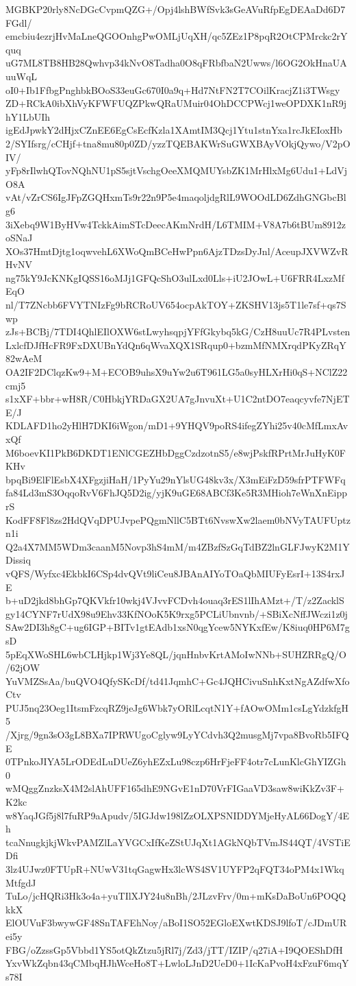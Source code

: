 MGBKP20rly8NcDGcCvpmQZG+/Opj4lshBWfSvk3sGeAVuRfpEgDEAaDd6D7FGdl/
emcbiu4ezrjHvMaLneQGOOnhgPwOMLjUqXH/qc5ZEz1P8pqR2OtCPMrckc2rYquq
uG7ML8TB8HB28Qwhvp34kNvO8Tadha0O8qFRbfbaN2Uwws/l6OG2OkHnaUAuuWqL
oI0+Ib1FfbgPnghbkBOoS33euGc670I0a9q+Hd7NtFN2T7COilKracjZ1i3TWsgy
ZD+RCkA0ibXhVyKFWFUQZPkwQRaUMuir04OhDCCPWcj1weOPDXK1nR9jhY1LbUIh
igEdJpwkY2dHjxCZnEE6EgCsEcfKzla1XAmtIM3Qcj1Ytu1stnYxa1rcJkEIoxHb
2/SYIfsrg/cCHjf+tna8mu80p0ZD/yzzTQEBAKWrSuGWXBAyVOkjQywo/V2pOIV/
yFp8rIlwhQTovNQhNU1pS5sjtVschgOeeXMQMUYsbZK1MrHlxMg6Udu1+LdVjO8A
vAt/vZrCS6IgJFpZGQHxmTs9r22n9P5e4maqoljdgRlL9WOOdLD6ZdhGNGbcBlg6
3iXebq9W1ByHVw4TckkAimSTcDeecAKmNrdH/L6TMIM+V8A7b6tBUm8912zoSNaJ
XOs37HmtDjtg1oqwvehL6XWoQmBCeHwPpn6AjzTDzsDyJnl/AceupJXVWZvRHvNV
ng75kY9JcKNKgIQSS16oMJj1GFQcShO3ulLxd0Lls+iU2JOwL+U6FRR4LxzMfEqO
nl/T7ZNcbb6FVYTNIzFg9bRCRoUV654ocpAkTOY+ZKSHV13js5T1le7sf+qs7Swp
zJs+BCBj/7TDI4QhlEIlOXW6stLwyhsqpjYFfGkybq5kG/CzH8uuUc7R4PLvsten
LxlcfDJfHcFR9FxDXUBnYdQn6qWvaXQX1SRqup0+bzmMfNMXrqdPKyZRqY82wAeM
OA2IF2DClqzKw9+M+ECOB9uhsX9uYw2u6T961LG5a0syHLXrHi0qS+NClZ22cmj5
s1xXF+bbr+wH8R/C0HbkjYRDaGX2UA7gJnvuXt+U1C2ntDO7eaqcyvfe7NjETE/J
KDLAFD1ho2yHlH7DKI6iWgon/mD1+9YHQV9poRS4ifegZYhi25v40cMfLmxAvxQf
M6boevKI1PkB6DKDT1ENlCGEZHbDggCzdzotnS5/e8wjPskfRPrtMrJuHyK0FKHv
bpqBi9ElFlEsbX4XFgzjiHaH/1PyYu29nYlsUG48kv3x/X3mEiFzD59sfrPTFWFq
fa84Ld3mS3OqqoRvV6FhJQ5D2ig/yjK9uGE68ABCf3Ke5R3MHioh7eWnXnEipprS
KodFF8Fl8zs2HdQVqDPUJvpePQgmNllC5BTt6NvswXw2laem0bNVyTAUFUptzn1i
Q2a4X7MM5WDm3caanM5Novp3hS4mM/m4ZBzfSzGqTdBZ2lnGLFJwyK2M1YDissiq
vQFS/Wyfxc4EkbkI6CSp4dvQVt9liCeu8JBAnAIYoTOaQbMIUFyEsrI+13S4rxJE
b+uD2jkd8bhGp7QKVkfr10wkj4VJvvFCDvh4ouaq3rES1lIhAMzt+/T/z2ZacklS
gy14CYNF7rUdX98u9Ehv33KfNOoK5K9rxg5PCLiUbnvnb/+SBiXcNffJWczi1z0j
SAw2DI3h8gC+ug6IGP+BITv1gtEAdb1xsN0qgYcew5NYKxfEw/K8iuq0HP6M7gsD
5pEqXWoSHL6wbCLHjkp1Wj3Ye8QL/jqnHnbvKrtAMoIwNNb+SUHZRRgQ/O/62jOW
YuVMZSsAa/buQVO4QfySKcDf/td41JqmhC+Gc4JQHCivuSnhKxtNgAZdfwXfoCtv
PUJ5nq23Oeg1ItsmFzcqRZ9jeJg6Wbk7yORlLcqtN1Y+fAOwOMm1csLgYdzkfgH5
/Xjrg/9gn3sO3gL8BXa7IPRWUgoCglyw9LyYCdvh3Q2musgMj7vpa8BvoRb5IFQE
0TPnkoJIYA5LrODEdLuDUeZ6yhEZxLu98czp6HrFjeFF4otr7cLunKlcGhYIZGh0
wMQggZnzksX4M2slAhUFF165dhE9NGvE1nD70VrFIGaaVD3saw8wiKkZv3F+K2kc
w8YaqJGf5j8l7fuRP9aApudv/5IGJdw198lZzOLXPSNIDDYMjeHyAL66DogY/4Eh
tcaNnugkjkjWkvPAMZlLaYVGCxIfKeZStUJqXt1AGkNQbTVmJS44QT/4VSTiEDfi
3lz4UJwz0FTUpR+NUwV31tqGagwHx3lcWS4SV1UYFP2qFQT34oPM4x1WkqMtfgdJ
TuLo/jcHQRi3Hk3o4a+yuTIlXJY24u8nBh/2JLzvFrv/0m+mKsDaBoUn6POQQkkX
ElOUVuF3bwywGF48SnTAFEhNoy/aBoI1SO52EGloEXwtKDSJ9lfoT/cJDmURei5y
FBG/oZzssGp5Vbbd1YS5otQkZtzu5jRl7j/Zd3/jTT/IZIP/q27iA+I9QOEShDfH
YxvWkZqbn43qCMbqHJhWceHo8T+LwloLJnD2UeD0+1IcKaPvoH4xFzuF6mqYs78I
